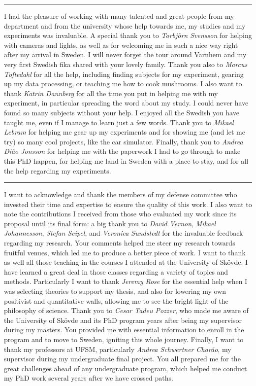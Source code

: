\vspace{7pt}\hrule\vspace{5pt}

I had the pleasure of working with many talented and great people from my department and from the university whose help towards me, my studies and my experiments was invaluable. A special thank you to \textit{Torbj{\"o}rn Svensson} for helping with cameras and lights, as well as for welcoming me in such a nice way right after my arrival in Sweden. I will never forget the tour around Varnhem and my very first Swedish fika shared with your lovely family. Thank you also to \textit{Marcus Toftedahl} for all the help, including finding subjects for my experiment, gearing up my data processing, or teaching me how to cook mushrooms. I also want to thank \textit{Katrin Dannberg} for all the time you put in helping me with my experiment, in particular spreading the word about my study. I could never have found so many subjects without your help. I enjoyed all the Swedish you have taught me, even if I manage to learn just a few words. Thank you to \textit{Mikael Lebram} for helping me gear up my experiments and for showing me (and let me try) so many cool projects, like the car simulator. Finally, thank you to \textit{Andrea Di{\~a}o Jonsson} for helping me with the paperwork I had to go through to make this PhD happen, for helping me land in Sweden with a place to stay, and for all the help regarding my experiments.

\vspace{7pt}\hrule\vspace{5pt}

I want to acknowledge and thank the members of my defense committee who invested their time and expertise to ensure the quality of this work. I also want to note the contributions I received from those who evaluated my work since its proposal until its final form: a big thank you to \textit{David Vernon}, \textit{Mikael Johannesson}, \textit{Stefan Seipel}, and \textit{Veronica Sundstedt} for the invaluable feedback regarding my research. Your comments helped me steer my research towards fruitful venues, which led me to produce a better piece of work. I want to thank as well all those teaching in the courses I attended at the University of Sk{\"o}vde. I have learned a great deal in those classes regarding a variety of topics and methods. Particularly I want to thank \textit{Jeremy Rose} for the essential help when I was selecting theories to support my thesis, and also for lowering my own positivist and quantitative walls, allowing me to see the bright light of the philosophy of science. Thank you to \textit{Cesar Tadeu Pozzer}, who made me aware of the University of Sk{\"o}vde and its PhD program years after being my supervisor during my masters. You provided me with essential information to enroll in the program and to move to Sweden, igniting this whole journey. Finally, I want to thank my professors at UFSM, particularly \textit{Andrea Schwertner Char{\~a}o}, my supervisor during my undergraduate final project. You all prepared me for the great challenges ahead of any undergraduate program, which helped me conduct my PhD work several years after we have crossed paths.

